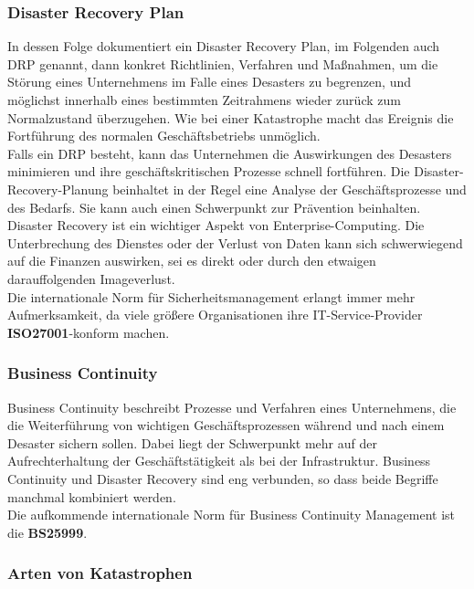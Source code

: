 \documentclass[letterpaper, 12pt]{article}
\let\tempsubsubsection\subsubsection
\renewcommand\subsubsection[1]{\vspace{0cm}\tempsubsubsection{#1}\vspace{0cm}}
\begin{document}
\subsubsection{Disaster Recovery Plan}

In dessen Folge dokumentiert ein Disaster Recovery Plan, im Folgenden auch DRP genannt, dann konkret Richtlinien, Verfahren und Maßnahmen, um die Störung eines Unternehmens im Falle eines Desasters zu begrenzen, und möglichst innerhalb eines bestimmten Zeitrahmens wieder zurück zum Normalzustand überzugehen. Wie bei einer Katastrophe macht das Ereignis die Fortführung des normalen Geschäftsbetriebs unmöglich. \\
Falls ein DRP besteht, kann das Unternehmen die Auswirkungen des Desasters minimieren und ihre geschäftskritischen Prozesse schnell fortführen. Die Disaster-Recovery-Planung beinhaltet in der Regel eine Analyse der Geschäftsprozesse und des Bedarfs. Sie kann auch einen Schwerpunkt zur Prävention beinhalten. Disaster Recovery ist ein wichtiger Aspekt von Enterprise-Computing. Die Unterbrechung des Dienstes oder der Verlust von Daten kann sich schwerwiegend auf die Finanzen auswirken, sei es direkt oder durch den etwaigen darauffolgenden Imageverlust. \\
Die internationale Norm für Sicherheitsmanagement erlangt immer mehr Aufmerksamkeit, da viele größere Organisationen ihre IT-Service-Provider \textbf{ISO27001}-konform machen.

\subsubsection{Business Continuity}

Business Continuity beschreibt Prozesse und Verfahren eines Unternehmens, die die Weiterführung von wichtigen Geschäftsprozessen während und nach einem Desaster sichern sollen. Dabei liegt der Schwerpunkt mehr auf der Aufrechterhaltung der Geschäftstätigkeit als bei der Infrastruktur. Business Continuity und Disaster Recovery sind eng verbunden, so dass beide Begriffe manchmal kombiniert werden. \\
Die aufkommende internationale Norm für Business Continuity Management ist die \textbf{BS25999}. \\

\subsubsection{Arten von Katastrophen}
\end{document}
